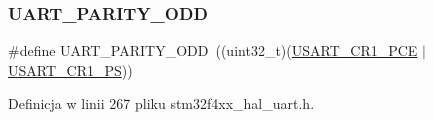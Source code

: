 \subsubsection{\texorpdfstring{U\+A\+R\+T\+\_\+\+P\+A\+R\+I\+T\+Y\+\_\+\+O\+DD}{UART\_PARITY\_ODD}}
{\footnotesize\ttfamily \#define U\+A\+R\+T\+\_\+\+P\+A\+R\+I\+T\+Y\+\_\+\+O\+DD~((uint32\+\_\+t)(\hyperlink{group___peripheral___registers___bits___definition_ga60f8fcf084f9a8514efafb617c70b074}{U\+S\+A\+R\+T\+\_\+\+C\+R1\+\_\+\+P\+CE} $\vert$ \hyperlink{group___peripheral___registers___bits___definition_ga2e159d36ab2c93a2c1942df60e9eebbe}{U\+S\+A\+R\+T\+\_\+\+C\+R1\+\_\+\+PS}))}



Definicja w linii 267 pliku stm32f4xx\+\_\+hal\+\_\+uart.\+h.

